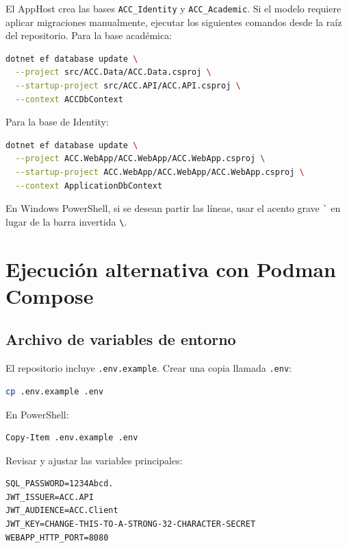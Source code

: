 \documentclass[12pt,letterpaper]{article}
\begin{document}
El AppHost crea las bases \texttt{ACC\_Identity} y \texttt{ACC\_Academic}. Si el modelo requiere aplicar migraciones manualmente, ejecutar los siguientes comandos desde la ra\'iz del repositorio. Para la base acad\'emica:

\begin{lstlisting}[language=bash,caption={Migraciones de la base acad\'emica.}]
dotnet ef database update \
  --project src/ACC.Data/ACC.Data.csproj \
  --startup-project src/ACC.API/ACC.API.csproj \
  --context ACCDbContext
\end{lstlisting}

Para la base de Identity:

\begin{lstlisting}[language=bash,caption={Migraciones de la base Identity.}]
dotnet ef database update \
  --project ACC.WebApp/ACC.WebApp/ACC.WebApp.csproj \
  --startup-project ACC.WebApp/ACC.WebApp/ACC.WebApp.csproj \
  --context ApplicationDbContext
\end{lstlisting}

En Windows PowerShell, si se desean partir las l\'ineas, usar el acento grave \verb|`| en lugar de la barra invertida \texttt{\textbackslash}.

\section{Ejecuci\'on alternativa con Podman Compose}

\subsection{Archivo de variables de entorno}

El repositorio incluye \texttt{.env.example}. Crear una copia llamada \texttt{.env}:

\begin{lstlisting}[language=bash,caption={Creaci\'on del archivo .env.}]
cp .env.example .env
\end{lstlisting}

En PowerShell:

\begin{lstlisting}[language=bash,caption={Creaci\'on del archivo .env en PowerShell.}]
Copy-Item .env.example .env
\end{lstlisting}

Revisar y ajustar las variables principales:

\begin{lstlisting}[caption={Variables principales para contenedores.}]
SQL_PASSWORD=1234Abcd.
JWT_ISSUER=ACC.API
JWT_AUDIENCE=ACC.Client
JWT_KEY=CHANGE-THIS-TO-A-STRONG-32-CHARACTER-SECRET
WEBAPP_HTTP_PORT=8080
\end{lstlisting}
\end{document}
